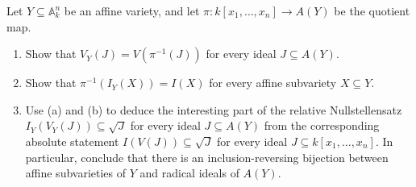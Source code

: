 \documentclass[11pt, letterpaper]{article}
\begin{document}
\begin{problem}
	Let $Y\subseteq \mathbb{A} _k^n$ be an affine variety, and let $\pi : k[x_1, \ldots , x_n] \to A(Y)$ be the quotient map.
	\begin{enumerate}
		\item Show that $V_Y(J)=V(\pi ^{-1} (J))$ for every ideal $J\subseteq A(Y)$.
		\item Show that $\pi ^{-1} (I_Y(X)) = I(X)$ for every affine subvariety $X\subseteq Y$.
		\item Use (a) and (b) to deduce the interesting part of the relative Nullstellensatz $I_Y(V_Y(J)) \subseteq \sqrt{J} $ for every ideal $J\subseteq A(Y)$ from the corresponding absolute statement $I(V(J))\subseteq \sqrt{J} $ for every ideal $J\subseteq k[x_1, \ldots , x_n]$. In particular, conclude that there is an inclusion-reversing bijection between affine subvarieties of $Y$ and radical ideals of $A(Y)$.
	\end{enumerate}
\end{problem}
\end{document}
